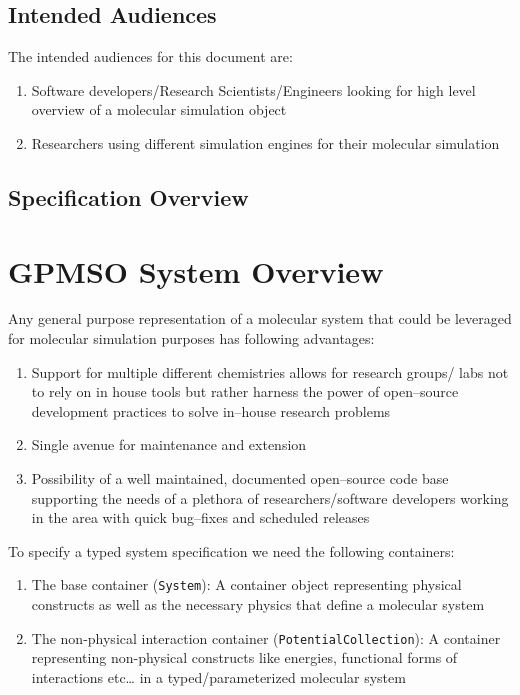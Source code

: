 \documentclass[12pt]{article}
\begin{document}
\subsection{Intended Audiences}
The intended audiences for this document are:

\begin{enumerate}
    \item Software developers/Research Scientists/Engineers looking for high level overview of a molecular simulation object
    \item Researchers using different simulation engines for their molecular simulation
\end{enumerate}

\subsection{Specification Overview}

\pagebreak
\section{GPMSO System Overview}
Any general purpose representation of a molecular system that could be leveraged for molecular simulation purposes has following advantages:
\begin{enumerate}
    \item Support for multiple different chemistries allows for research groups/ labs not to rely on in house tools but rather harness the power of open--source development practices to solve in--house research problems
    \item Single avenue for maintenance and extension
    \item Possibility of a well maintained, documented open--source code base supporting the needs of a plethora of researchers/software developers working in the area with quick bug--fixes and scheduled releases
\end{enumerate}

\noindent To specify a typed system specification we need the following containers:

\begin{enumerate}
    \item The base container (\texttt{System}): A container object representing physical constructs as well as the necessary physics that define a molecular system

    \item The non-physical interaction container (\texttt{PotentialCollection}): A container representing non-physical constructs like energies, functional forms of interactions etc… in a typed/parameterized molecular system
\end{enumerate}
\end{document}
